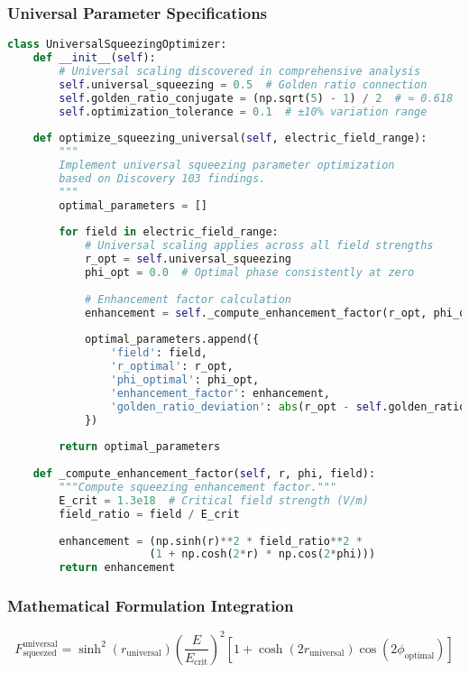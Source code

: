 \documentclass[11pt]{article}
\begin{document}
\subsubsection{Universal Parameter Specifications}
\begin{lstlisting}[language=Python]
class UniversalSqueezingOptimizer:
    def __init__(self):
        # Universal scaling discovered in comprehensive analysis
        self.universal_squeezing = 0.5  # Golden ratio connection
        self.golden_ratio_conjugate = (np.sqrt(5) - 1) / 2  # ≈ 0.618
        self.optimization_tolerance = 0.1  # ±10% variation range
        
    def optimize_squeezing_universal(self, electric_field_range):
        """
        Implement universal squeezing parameter optimization
        based on Discovery 103 findings.
        """
        optimal_parameters = []
        
        for field in electric_field_range:
            # Universal scaling applies across all field strengths
            r_opt = self.universal_squeezing
            phi_opt = 0.0  # Optimal phase consistently at zero
            
            # Enhancement factor calculation
            enhancement = self._compute_enhancement_factor(r_opt, phi_opt, field)
            
            optimal_parameters.append({
                'field': field,
                'r_optimal': r_opt,
                'phi_optimal': phi_opt,
                'enhancement_factor': enhancement,
                'golden_ratio_deviation': abs(r_opt - self.golden_ratio_conjugate)
            })
            
        return optimal_parameters
    
    def _compute_enhancement_factor(self, r, phi, field):
        """Compute squeezing enhancement factor."""
        E_crit = 1.3e18  # Critical field strength (V/m)
        field_ratio = field / E_crit
        
        enhancement = (np.sinh(r)**2 * field_ratio**2 * 
                      (1 + np.cosh(2*r) * np.cos(2*phi)))
        return enhancement
\end{lstlisting}

\subsubsection{Mathematical Formulation Integration}
\begin{equation}
F_{\text{squeezed}}^{\text{universal}} = \sinh^2(r_{\text{universal}}) \left(\frac{E}{E_{\text{crit}}}\right)^2 [1 + \cosh(2r_{\text{universal}})\cos(2\phi_{\text{optimal}})]
\end{equation}
\end{document}
